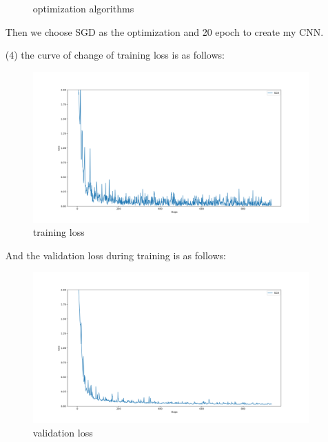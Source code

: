 \begin{solution}
\begin{enumerate}
\begin{figure}[H]
                \caption{optimization algorithms}
            \end{figure}
            Then we choose SGD as the optimization and 20 epoch to create my CNN.
        \item[(4)] the curve of change of training loss is as follows:
            \begin{figure}[H]
                \centering
                \includegraphics[scale=0.35]{6.png}
                \caption{training loss}
            \end{figure}
            And the validation loss during training is as follows:
            \begin{figure}[H]
                \centering
                \includegraphics[scale=0.35]{7.png}
                \caption{validation loss}
            \end{figure}
    \end{enumerate}
\end{solution}

